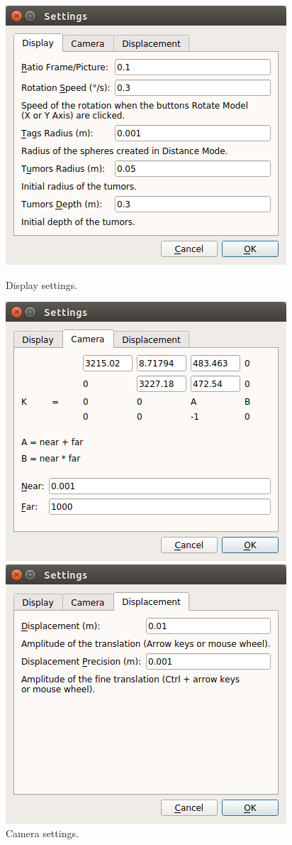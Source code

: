 \documentclass[12pt]{report}
\begin{document}
\vspace{10pt}
\begin{figure}[H]
\centerline{\includegraphics[scale = 0.38]{img/Settings_001.png}}
\caption{Display settings.}
\label{settings_001}
\endminipage\hfill
{}
\centerline{\includegraphics[scale = 0.38]{img/Settings_002.png}}
\caption{Camera settings.}
\label{settings_002}
\endminipage\hfill
{}\vspace{14pt}
\centerline{\includegraphics[scale = 0.38]{img/Settings_003.png}}

\end{figure}
\end{document}

